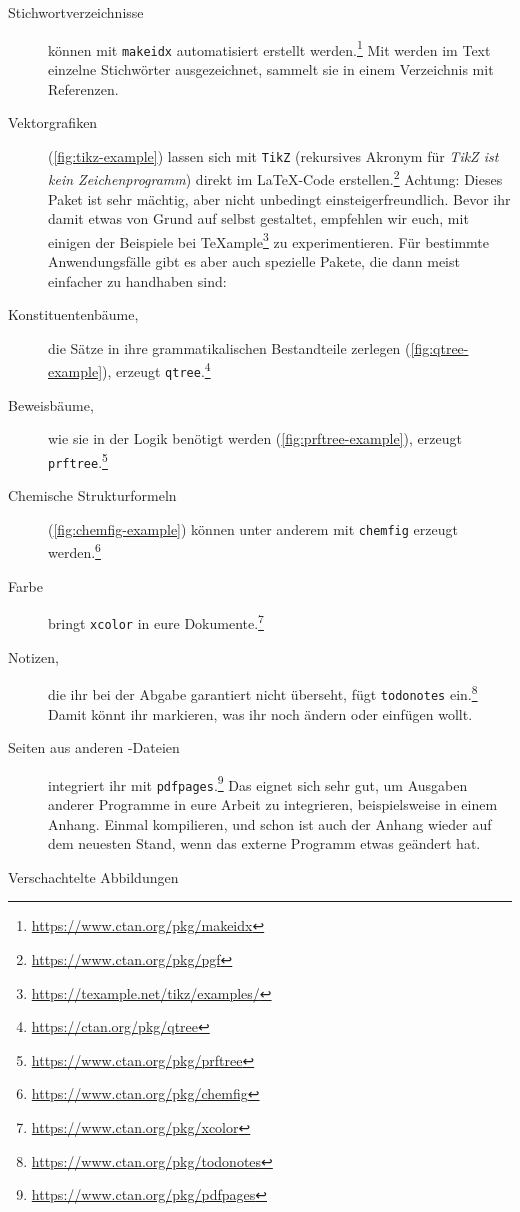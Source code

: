 \begin{description}
	\item[Stichwortverzeichnisse]
		können mit \texttt{makeidx} automatisiert erstellt werden.\footnote{\url{https://www.ctan.org/pkg/makeidx}}
		Mit \texttt{} werden im Text einzelne Stichwörter ausgezeichnet, \texttt{\printindex} sammelt sie in einem Verzeichnis mit Referenzen.
	\item[Vektorgrafiken]
		(\cref{fig:tikz-example})
		lassen sich mit \texttt{TikZ} (rekursives Akronym für \emph{TikZ ist kein Zeichenprogramm}) direkt im \LaTeX{}-Code erstellen.\footnote{\url{https://www.ctan.org/pkg/pgf}}
		Achtung: Dieses Paket ist sehr mächtig, aber nicht unbedingt einsteigerfreundlich.
		Bevor ihr damit etwas von Grund auf selbst gestaltet, empfehlen wir euch, mit einigen der Beispiele bei \TeX{}ample\footnote{\url{https://texample.net/tikz/examples/}} zu experimentieren.
		Für bestimmte Anwendungsfälle gibt es aber auch spezielle Pakete, die dann meist einfacher zu handhaben sind:
	\item[Konstituentenbäume,]
		die Sätze in ihre grammatikalischen Bestandteile zerlegen (\cref{fig:qtree-example}), erzeugt \texttt{qtree}.\footnote{\url{https://ctan.org/pkg/qtree}}
	\item[Beweisbäume,]
		wie sie in der Logik benötigt werden (\cref{fig:prftree-example}), erzeugt \texttt{prftree}.\footnote{\url{https://www.ctan.org/pkg/prftree}}
	\item[Chemische Strukturformeln]
		(\cref{fig:chemfig-example})
		können unter anderem mit \texttt{chemfig} erzeugt werden.\footnote{\url{https://www.ctan.org/pkg/chemfig}}
	\item[Farbe]
		bringt \texttt{xcolor} in eure Dokumente.\footnote{\url{https://www.ctan.org/pkg/xcolor}}
	\item[Notizen,]
		die ihr bei der Abgabe garantiert nicht überseht, fügt \texttt{todonotes} ein.\footnote{\url{https://www.ctan.org/pkg/todonotes}}
		Damit könnt ihr markieren, was ihr noch ändern oder einfügen wollt.
	\item[Seiten aus anderen -Dateien]
		integriert ihr mit \texttt{pdfpages}.\footnote{\url{https://www.ctan.org/pkg/pdfpages}}
		Das eignet sich sehr gut, um Ausgaben anderer Programme in eure Arbeit zu integrieren, beispielsweise in einem Anhang. 
		Einmal kompilieren, und schon ist auch der Anhang wieder auf dem neuesten Stand, wenn das externe Programm etwas geändert hat.
	\item[Verschachtelte Abbildungen]

\end{description}
